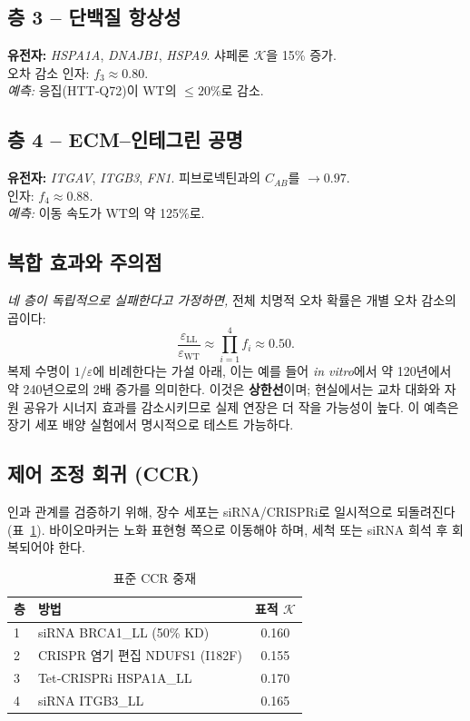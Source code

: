 \documentclass[12pt,a4paper]{article}
\newcommand{\REL}{\mathcal{K}}          %
\begin{document}
	\subsection{층 3 – 단백질 항상성}
	\textbf{유전자:} \emph{HSPA1A}, \emph{DNAJB1}, \emph{HSPA9}. 샤페론 \(\REL\)을 15\% 증가.\\
	오차 감소 인자: \(f_3 \approx 0.80\).\\
	\textit{예측:} 응집(HTT‑Q72)이 WT의 \(\le 20\%\)로 감소.
	
	\subsection{층 4 – ECM–인테그린 공명}
	\textbf{유전자:} \emph{ITGAV}, \emph{ITGB3}, \emph{FN1}. 피브로넥틴과의 \(C_{AB}\)를 \(\to 0.97\).\\
	인자: \(f_4 \approx 0.88\).\\
	\textit{예측:} 이동 속도가 WT의 약 125\%로.
	
	\subsection{복합 효과와 주의점}
	\textit{네 층이 독립적으로 실패한다고 가정하면,} 전체 치명적 오차 확률은 개별 오차 감소의 곱이다:
	\[
	\frac{\varepsilon_{\mathrm{LL}}}{\varepsilon_{\mathrm{WT}}} \approx \prod_{i=1}^{4} f_i \approx 0.50.
	\]
	복제 수명이 \(1/\varepsilon\)에 비례한다는 가설 아래, 이는 예를 들어 \textit{in vitro}에서 약 120년에서 약 240년으로의 2배 증가를 의미한다. 이것은 \textbf{상한선}이며; 현실에서는 교차 대화와 자원 공유가 시너지 효과를 감소시키므로 실제 연장은 더 작을 가능성이 높다. 이 예측은 장기 세포 배양 실험에서 명시적으로 테스트 가능하다.
	
	\subsection{제어 조정 회귀 (CCR)}
	인과 관계를 검증하기 위해, 장수 세포는 siRNA/CRISPRi로 일시적으로 되돌려진다(표~\ref{tab:CCR}). 바이오마커는 노화 표현형 쪽으로 이동해야 하며, 세척 또는 siRNA 희석 후 회복되어야 한다.
	
	\begin{table}[H]
		\centering
		\caption{표준 CCR 중재}
		\label{tab:CCR}
		\begin{tabular}{@{}llc@{}}
			\toprule
			\textbf{층} & \textbf{방법} & \textbf{표적 \(\REL\)} \\
			\midrule
			1 & siRNA BRCA1\_LL (50\% KD) & 0.160 \\
			2 & CRISPR 염기 편집 NDUFS1 (I182F) & 0.155 \\
			3 & Tet‑CRISPRi HSPA1A\_LL & 0.170 \\
			4 & siRNA ITGB3\_LL & 0.165 \\
			\bottomrule
		\end{tabular}
	\end{table}
	
\end{document}
